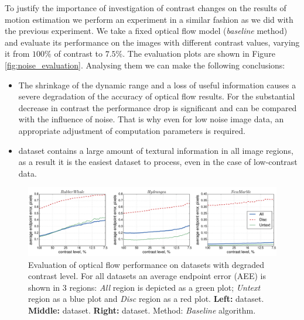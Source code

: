 To justify the importance of investigation of contrast changes on the results of motion estimation we perform an experiment in a similar fashion as we did with the previous experiment. We take a fixed optical flow model (\textit{baseline} method) and evaluate its performance on the images with different contrast values, varying it from $100\%$ of contrast to $7.5\%$. The evaluation plots are shown in Figure \ref{fig:noise_evaluation}.
Analysing them we can make the following conclusions:
\begin{itemize}
	\item The shrinkage of the dynamic range and a loss of useful information causes a severe degradation of the accuracy of optical flow results. For the substantial decrease in contrast the performance drop is significant and can be compared with the influence of noise. That is why even for low noise image data, an appropriate adjustment of computation parameters is required. 
	
	\item \hyd dataset contains a large amount of textural information in all image regions, as a result it is the easiest dataset to process, even in the case of low-contrast data.
	
\end{itemize}




\begin{figure}[h]
    \centering
    \includegraphics[width=\textwidth]{figures/exp_contrast_comp_3_datasets.pdf}
  
  \caption[Fixed vs Optimal]{Evaluation of optical flow performance on 
 datasets with degraded  contrast level. For all datasets an average endpoint error (AEE) is shown in 3 regions: \textit{All} region is depicted as a green plot; \textit{Untext} region as a blue plot and \textit{Disc} region as a red plot.  \textbf{Left:} \rub dataset. \textbf{Middle:} \hyd dataset. \textbf{Right:} \mar dataset. Method: \textit{Baseline} algorithm.}
  \label{fig:contrast_evaluation}
\end{figure}

